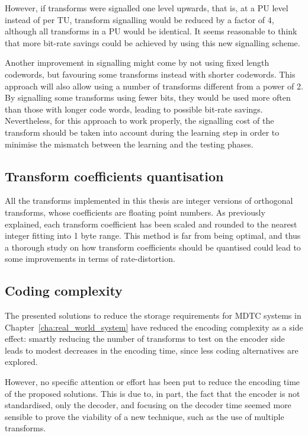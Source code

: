 \documentclass[11pt,a4paper,openright,twoside]{book}
\numberwithin{equation}{section} %
\numberwithin{figure}{section} %
\numberwithin{table}{section} %
\begin{document}
However, if transforms were signalled one level upwards, that is, at a \ac{PU}
level instead of per \ac{TU}, transform signalling would be reduced by a
factor of 4, although all transforms in a \ac{PU} would be identical.
It seems reasonable to think that more bit-rate savings could be achieved by
using this new signalling scheme.

Another improvement in signalling might come by not using fixed length
codewords, but favouring some transforms instead with shorter codewords.
This approach will also allow using a number of transforms different from a
power of 2.
By signalling some transforms using fewer bits, they would be used more often
than those with longer code words, leading to possible bit-rate savings.
Nevertheless, for this approach to work properly, the signalling cost of the
transform should be taken into account during the learning step in order to
minimise the mismatch between the learning and the testing phases.

\subsection*{Transform coefficients quantisation}
\label{sub:transform_coefficients_quantisation}

All the transforms implemented in this thesis are integer versions of
orthogonal transforms, whose coefficients are floating point numbers.
As previously explained, each transform coefficient has been scaled and
rounded to the nearest integer fitting into 1 byte range.
This method is far from being optimal, and thus a thorough study on how
transform coefficients should be quantised could lead to some improvements in
terms of rate-distortion.

\subsection*{Coding complexity}
\label{sub:coding_complexity}

The presented solutions to reduce the storage requirements for \ac{MDTC}
systems in Chapter~\ref{cha:real_world_system} have reduced the encoding
complexity as a side effect:
smartly reducing the number of transforms to test on the encoder side leads to
modest decreases in the encoding time, since less coding alternatives are
explored.

However, no specific attention or effort has been put to reduce the encoding
time of the proposed solutions.
This is due to, in part, the fact that the encoder is not standardised, only
the decoder, and focusing on the decoder time seemed more sensible to prove
the viability of a new technique, such as the use of multiple transforms.
\end{document}
